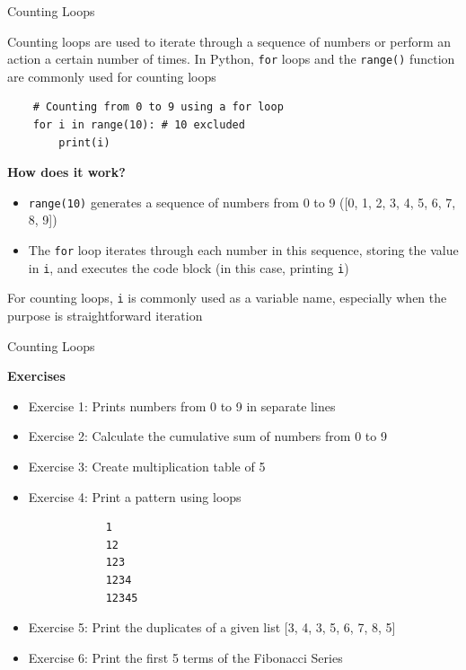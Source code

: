 \documentclass[
	11pt, 
]{beamer}
\begin{document}

\begin{frame}[fragile]{Counting Loops}

Counting loops are used to iterate through a sequence of numbers or perform an action a certain number of times. In Python, \texttt{for} loops and the \texttt{range()} function are commonly used for counting loops

\begin{verbatim}
    # Counting from 0 to 9 using a for loop
    for i in range(10): # 10 excluded
        print(i)
\end{verbatim}

\begin{exampleblock}{\textbf{How does it work?}}
\begin{itemize}
    \item \texttt{range(10)} generates a sequence of numbers from 0 to 9 ([0, 1, 2, 3, 4, 5, 6, 7, 8, 9])
    \item The \texttt{for} loop iterates through each number in this sequence, storing the value in \texttt{i}, and executes the code block (in this case, printing \texttt{i})
\end{itemize}
\end{exampleblock}

\vspace{.1cm}
For counting loops, \texttt{i} is commonly used as a variable name, especially when the purpose is straightforward iteration

\end{frame}


\begin{frame}[fragile]{Counting Loops}

\begin{alertblock}{\textbf{Exercises}}
\begin{itemize}
    \item Exercise 1: Prints numbers from 0 to 9 in separate lines
    \item Exercise 2: Calculate the cumulative sum of numbers from 0 to 9
    \item Exercise 3: Create multiplication table of 5
    \item Exercise 4: Print a pattern using loops
        \begin{verbatim}
            1
            12
            123
            1234
            12345
        \end{verbatim}
    \item Exercise 5: Print the duplicates of a given list [3, 4, 3, 5, 6, 7, 8, 5]
    \item Exercise 6: Print the first 5 terms of the Fibonacci Series
\end{itemize}    
\end{alertblock}
\end{frame}
\end{document}
